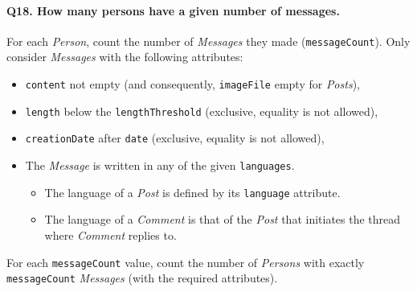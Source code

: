 \paragraph{\textbf{Q18}. How many persons have a given number of messages.}
For each \emph{Person}, count the number of \emph{Messages} they made
(\texttt{messageCount}). Only consider \emph{Messages} with the
following attributes:
\begin{itemize}
\item
  \texttt{content} not empty (and consequently, \texttt{imageFile} empty
  for \emph{Posts}),
\item
  \texttt{length} below the \texttt{lengthThreshold} (exclusive,
  equality is not allowed),
\item
  \texttt{creationDate} after \texttt{date} (exclusive, equality is not
  allowed),
\item
  The \emph{Message} is written in any of the given \texttt{languages}.
  \begin{itemize}
  \tightlist
  \item
    The language of a \emph{Post} is defined by its \texttt{language}
    attribute.
  \item
    The language of a \emph{Comment} is that of the \emph{Post} that
    initiates the thread where \emph{Comment} replies to.
  \end{itemize}
\end{itemize}
For each \texttt{messageCount} value, count the number of \emph{Persons}
with exactly \texttt{messageCount} \emph{Messages} (with the required
attributes).
